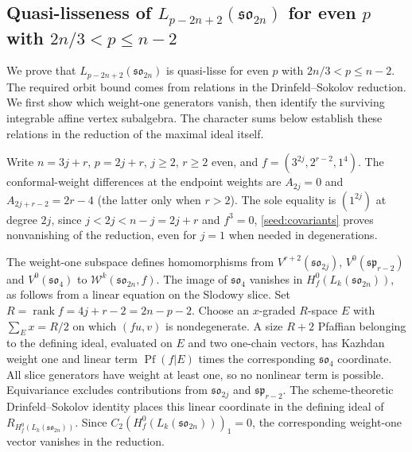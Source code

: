 \documentclass[11pt,a4paper]{amsart}
\numberwithin{equation}{section}
\theoremstyle{definition}
\theoremstyle{remark}
\newcommand{\spg}{\mathfrak{sp}}
\newcommand{\sog}{\mathfrak{so}}
\newcommand{\rank}{\operatorname{rank}}
\newcommand{\WW}{\mathcal W}
\begin{document}
\subsection{\texorpdfstring{Quasi-lisseness of $L_{p-2n+2}(\sog_{2n})$ for even $p$ with $2n/3<p\le n-2$}{Quasi-lisseness of L(p-2n+2)(so(2n)) for even p with 2n/3 less than p at most n-2}}\label{seed:D-positive}
We prove that $L_{p-2n+2}(\sog_{2n})$ is quasi-lisse for even $p$
with $2n/3<p\le n-2$. The required orbit bound comes from relations
in the Drinfeld--Sokolov reduction. We first show which weight-one
generators vanish, then identify the surviving integrable affine
vertex subalgebra. The character sums below establish these relations in the
reduction of the maximal ideal itself.

Write $n=3j+r$, $p=2j+r$, $j\ge2$, $r\ge2$ even, and
$f=(3^{2j},2^{r-2},1^4)$. The conformal-weight differences at the endpoint weights are
$A_{2j}=0$ and $A_{2j+r-2}=2r-4$ (the latter only when $r>2$).
The sole equality is $(1^{2j})$ at degree $2j$, since
$j<2j<n-j=2j+r$ and $f^3=0$, \cref{seed:covariants} proves
nonvanishing of the reduction, even for $j=1$ when needed in degenerations.

The weight-one subspace defines homomorphisms from
$V^{r+2}(\sog_{2j})$, $V^0(\spg_{r-2})$ and $V^0(\sog_4)$
to $\WW^k(\sog_{2n},f)$. The image of $\sog_4$ vanishes in
$H_f^0(L_k(\sog_{2n}))$, as follows from a linear equation on the Slodowy slice. Set
$R=\rank f=4j+r-2=2n-p-2$. Choose an $x$-graded $R$-space $E$
with $\sum_{E}x=R/2$ on which $(fu,v)$ is nondegenerate. A size
$R+2$ Pfaffian belonging to the defining ideal, evaluated on $E$ and two one-chain vectors,
has Kazhdan weight one and linear term $\operatorname{Pf}(f|E)$
times the corresponding $\sog_4$ coordinate. All slice generators have
weight at least one, so no nonlinear term is possible. Equivariance
excludes contributions from $\sog_{2j}$ and $\spg_{r-2}$.
The scheme-theoretic Drinfeld--Sokolov identity places this linear
coordinate in the defining ideal of $R_{H_f^0(L_k(\sog_{2n}))}$.
Since $C_2(H_f^0(L_k(\sog_{2n})))_1=0$, the corresponding
weight-one vector vanishes in the reduction.
\end{document}
